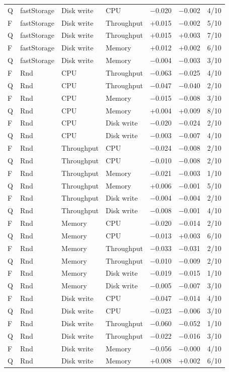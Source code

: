 \begin{longtable}{@{}llllrrr@{}}
Q & fastStorage & Disk write & CPU & $-$0.020 & $-$0.002 & 4/10 \\
F & fastStorage & Disk write & Throughput & +0.015 & $-$0.002 & 5/10 \\
Q & fastStorage & Disk write & Throughput & +0.015 & +0.003 & 7/10 \\
F & fastStorage & Disk write & Memory & +0.012 & +0.002 & 6/10 \\
Q & fastStorage & Disk write & Memory & $-$0.004 & $-$0.003 & 3/10 \\
F & Rnd & CPU & Throughput & $-$0.063 & $-$0.025 & 4/10 \\
Q & Rnd & CPU & Throughput & $-$0.047 & $-$0.040 & 2/10 \\
F & Rnd & CPU & Memory & $-$0.015 & $-$0.008 & 3/10 \\
Q & Rnd & CPU & Memory & +0.004 & +0.009 & 8/10 \\
F & Rnd & CPU & Disk write & $-$0.020 & $-$0.024 & 2/10 \\
Q & Rnd & CPU & Disk write & $-$0.003 & $-$0.007 & 4/10 \\
F & Rnd & Throughput & CPU & $-$0.024 & $-$0.008 & 2/10 \\
Q & Rnd & Throughput & CPU & $-$0.010 & $-$0.008 & 2/10 \\
F & Rnd & Throughput & Memory & $-$0.021 & $-$0.003 & 1/10 \\
Q & Rnd & Throughput & Memory & +0.006 & $-$0.001 & 5/10 \\
F & Rnd & Throughput & Disk write & $-$0.004 & $-$0.004 & 2/10 \\
Q & Rnd & Throughput & Disk write & $-$0.008 & $-$0.001 & 4/10 \\
F & Rnd & Memory & CPU & $-$0.020 & $-$0.014 & 2/10 \\
Q & Rnd & Memory & CPU & $-$0.013 & +0.003 & 6/10 \\
F & Rnd & Memory & Throughput & $-$0.033 & $-$0.031 & 2/10 \\
Q & Rnd & Memory & Throughput & $-$0.010 & $-$0.009 & 2/10 \\
F & Rnd & Memory & Disk write & $-$0.019 & $-$0.015 & 1/10 \\
Q & Rnd & Memory & Disk write & $-$0.005 & $-$0.007 & 3/10 \\
F & Rnd & Disk write & CPU & $-$0.047 & $-$0.014 & 4/10 \\
Q & Rnd & Disk write & CPU & $-$0.023 & $-$0.006 & 3/10 \\
F & Rnd & Disk write & Throughput & $-$0.060 & $-$0.052 & 1/10 \\
Q & Rnd & Disk write & Throughput & $-$0.022 & $-$0.016 & 3/10 \\
F & Rnd & Disk write & Memory & $-$0.056 & $-$0.000 & 4/10 \\
Q & Rnd & Disk write & Memory & +0.008 & +0.002 & 6/10 \\
\end{longtable}
\normalsize\setlength{\tabcolsep}{4pt}

